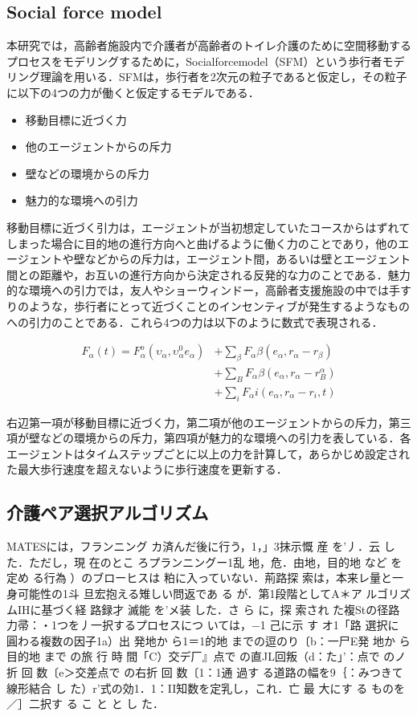 \subsection{Social force model}

本研究では，高齢者施設内で介護者が高齢者のトイレ介護のために空間移動するプロセスをモデリングするために，Socialforcemodel（SFM）\cite{SFM}という歩行者モデリング理論を用いる．SFMは，歩行者を2次元の粒子であると仮定し，その粒子に以下の4つの力が働くと仮定するモデルである．

\begin{itemize}
 \item 移動目標に近づく力
 \item 他のエージェントからの斥力
 \item 壁などの環境からの斥力
 \item 魅力的な環境への引力
\end{itemize}

移動目標に近づく引力は，エージェントが当初想定していたコースからはずれてしまった場合に目的地の進行方向へと曲げるように働く力のことであり，他のエージェントや壁などからの斥力は，エージェント間，あるいは壁とエージェント間との距離や，お互いの進行方向から決定される反発的な力のことである．魅力的な環境への引力では，友人やショーウィンドー，高齢者支援施設の中では手すりのような，歩行者にとって近づくことのインセンティブが発生するようなものへの引力のことである．これら4つの力は以下のように数式で表現される．

\begin{equation}
\begin{split}
 F_α(t)=F_α^o(υ_α,υ_α^0e_α)&+\sum_{β}F_αβ(e_α,r_α-r_β)\\
 &+\sum_{B}F_αβ(e_α,r_α-r_B^α)\\
 &+\sum_{i}F_αi(e_α,r_α-r_i,t)
\end{split}
\end{equation}

右辺第一項が移動目標に近づく力，第二項が他のエージェントからの斥力，第三項が壁などの環境からの斥力，第四項が魅力的な環境への引力を表している．各エージェントはタイムステップごとに以上の力を計算して，あらかじめ設定された最大歩行速度を超えないように歩行速度を更新する．

\subsection{介護ペア選択アルゴリズム}

MATESには，フランニング カ済んだ後に行う，1，」3抹示慨 産 を’丿．云 した．ただし，現 在のとこ ろプランニングー1乱 地，危．由地，目的地 など を定め る行為 ）のブローヒスは 粕に入っていない．荊路探 索は，本来レ量と一身可能性の1斗 旦宏抱える雉しい問返であ る が．第1段階としてA＊ア ルゴリズムIHに基づく経 路録才 滅能 を’メ装 した．さ ら に，探 索され た複Stの径路 力帚：・1つを丿一択するプロセスにつ  いては，−1   己に示 す オ1「路 選択に 圓わる複数の因子1a）出 発地か ら1＝1的地 までの逗のり〔b：一尸E発 地か ら目的地 まで の旅 行 時 間「C）交デ厂』点で の直JL回叛（d：た」’：点で のノ折 回 数〔e＞交差点で の右折 回 数〔1：1通 過す る道路の幅を9｛：みつきて線形結合 し た）r’式の効1．1：II知数を定乳し，これ．亡 最 大にす る ものを ／］二択す  る こ と と し た．

